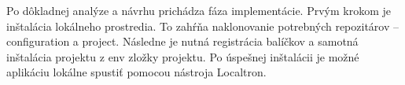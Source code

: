 %
%
%
%
%
%
%
%
%

Po dôkladnej analýze a návrhu prichádza fáza implementácie. Prvým krokom je inštalácia lokálneho prostredia. To zahŕňa naklonovanie potrebných repozitárov -- configuration a project. Následne je nutná registrácia balíčkov a samotná inštalácia projektu z env zložky projektu. Po úspešnej inštalácii je možné aplikáciu lokálne spustiť pomocou nástroja Localtron.

